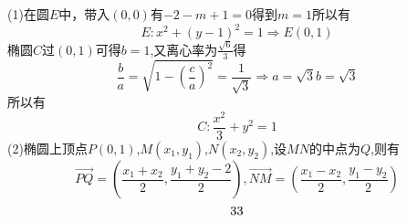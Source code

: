 (1)在圆$E$中，带入$(0,0)$有$-2-m+1=0$得到$m=1$所以有
\begin{equation}
E:{x^2} + {\left( {y - 1} \right)^2} = 1 \Rightarrow E\left( {0,1} \right)
\end{equation}
椭圆$C$过$(0,1)$可得$b=1$,又离心率为$\frac{{\sqrt 6 }}{3}$得
\begin{equation}
\frac{b}{a} = \sqrt {1 - {{\left( {\frac{c}{a}} \right)}^2}}  = \frac{1}{{\sqrt 3 }} \Rightarrow a = \sqrt 3 b = \sqrt 3
\end{equation}
所以有
\begin{equation}
C:\frac{{{x^2}}}{3} + {y^2} = 1
\end{equation}
(2)椭圆上顶点$P(0,1)$,$M\left( {{x_1},{y_1}} \right)$,$N\left( {{x_2},{y_2}} \right)$,设$MN$的中点为$Q$,则有
\begin{equation}
\overrightarrow {PQ}  = \left( {\frac{{{x_1} + {x_2}}}{2},\frac{{{y_1} + {y_2} - 2}}{2}} \right),\overrightarrow {NM}  = \left( {\frac{{{x_1} - {x_2}}}{2},\frac{{{y_1} - {y_2}}}{2}} \right)
\end{equation}
\begin{equation}
3
\newline
3
\end{equation}
